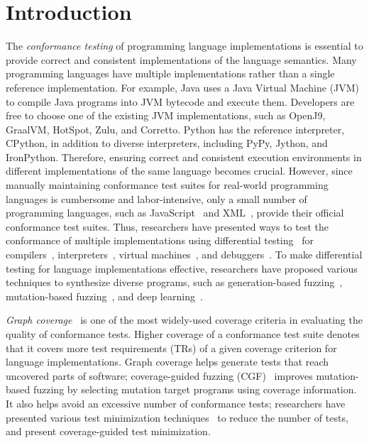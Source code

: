 \section{Introduction}\label{sec:intro}

The \textit{conformance testing} of programming language implementations is
essential to provide correct and consistent implementations of the
language semantics. Many programming languages have multiple implementations
rather than a single reference implementation. For example, Java uses a Java Virtual
Machine (JVM) to compile Java programs into JVM bytecode and execute them.
Developers are free to choose one of the existing JVM
implementations, such as OpenJ9, GraalVM, HotSpot, Zulu, and Corretto.
Python has the reference interpreter, CPython, in addition to diverse
interpreters, including PyPy, Jython, and IronPython.
Therefore, ensuring correct and consistent execution environments in different
implementations of the same language becomes crucial.
However, since manually maintaining conformance test suites for
real-world programming languages is cumbersome and labor-intensive, only a
small number of programming languages, such as JavaScript~\cite{test262}
and XML~\cite{xml-test-suite}, provide their official conformance test suites.
Thus, researchers have presented ways to test the
conformance of multiple implementations using differential
testing~\cite{diff-test} for compilers~\cite{csmith, deep-smith, diff-cpp-front,
diff-test-embedded}, interpreters~\cite{jit-picking, comfort}, virtual
machines~\cite{java-diff-test}, and debuggers~\cite{diff-debugger}.
To make differential testing for language implementations effective,
researchers have proposed various techniques to synthesize diverse programs,
such as generation-based fuzzing~\cite{csmith, jit-picking, diff-test-embedded, diff-debugger},
mutation-based fuzzing~\cite{java-diff-test, diff-cpp-front},
and deep learning~\cite{comfort, deep-smith}.


\textit{Graph coverage}~\cite{cov-def} is one of the most widely-used coverage criteria
in evaluating the quality of conformance tests.
Higher coverage of a conformance test suite denotes that it covers more
test requirements (TRs) of a given coverage criterion for language implementations.
Graph coverage helps generate tests that reach uncovered parts of software;
coverage-guided fuzzing (CGF)~\cite{afl} improves mutation-based fuzzing
by selecting mutation target programs using coverage information.
It also helps avoid an excessive number of conformance tests;
researchers have presented various test minimization techniques~\cite{test-minimize-survey}
to reduce the number of tests, and
\citet{cov-test-minimize} present coverage-guided test minimization.

